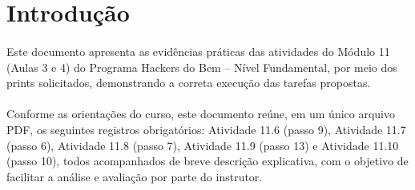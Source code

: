 \section{Introdução}

\paragraph{}
Este documento apresenta as evidências práticas das atividades do Módulo 11
(Aulas 3 e 4) do Programa Hackers do Bem -- Nível Fundamental, por meio dos
prints solicitados, demonstrando a correta execução das tarefas propostas.

\paragraph{}
Conforme as orientações do curso, este documento reúne, em um único arquivo
PDF, os seguintes registros obrigatórios: Atividade 11.6 (passo 9), Atividade
11.7 (passo 6), Atividade 11.8 (passo 7), Atividade 11.9 (passo 13) e Atividade
11.10 (passo 10), todos acompanhados de breve descrição explicativa, com o
objetivo de facilitar a análise e avaliação por parte do instrutor.
